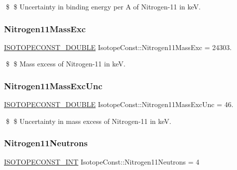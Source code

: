 \$ \$ Uncertainty in binding energy per A of Nitrogen-\/11 in keV. \mbox{\label{group___isotope_const-_nitrogen-_n11_ga93d7c62c606de58cc3df0cfbe4607565}} 
\subsubsection{\texorpdfstring{Nitrogen11\+Mass\+Exc}{Nitrogen11MassExc}}
{\footnotesize\ttfamily \mbox{\hyperlink{group___isotope_const-_macros_ga8f45a7272ce02c0b4c65c44636ed719a}{I\+S\+O\+T\+O\+P\+E\+C\+O\+N\+S\+T\+\_\+\+D\+O\+U\+B\+LE}} Isotope\+Const\+::\+Nitrogen11\+Mass\+Exc = 24303.}

\$ \$ Mass excess of Nitrogen-\/11 in keV. \mbox{\label{group___isotope_const-_nitrogen-_n11_ga84c903edfdf73d883e655672e45a3350}} 
\subsubsection{\texorpdfstring{Nitrogen11\+Mass\+Exc\+Unc}{Nitrogen11MassExcUnc}}
{\footnotesize\ttfamily \mbox{\hyperlink{group___isotope_const-_macros_ga8f45a7272ce02c0b4c65c44636ed719a}{I\+S\+O\+T\+O\+P\+E\+C\+O\+N\+S\+T\+\_\+\+D\+O\+U\+B\+LE}} Isotope\+Const\+::\+Nitrogen11\+Mass\+Exc\+Unc = 46.}

\$ \$ Uncertainty in mass excess of Nitrogen-\/11 in keV. \mbox{\label{group___isotope_const-_nitrogen-_n11_ga1ec16359a3a806a4d95d581d2df1a36c}} 
\subsubsection{\texorpdfstring{Nitrogen11\+Neutrons}{Nitrogen11Neutrons}}
{\footnotesize\ttfamily \mbox{\hyperlink{group___isotope_const-_macros_ga5f18360b3e99483a35c32d789e62621c}{I\+S\+O\+T\+O\+P\+E\+C\+O\+N\+S\+T\+\_\+\+I\+NT}} Isotope\+Const\+::\+Nitrogen11\+Neutrons = 4}

